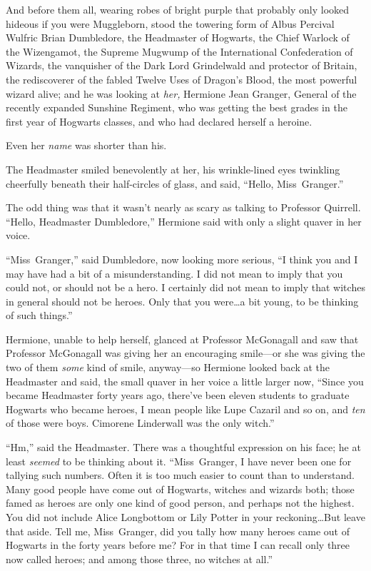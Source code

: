 And before them all, wearing robes of bright purple that probably only looked hideous if you were Muggleborn, stood the towering form of Albus Percival Wulfric Brian Dumbledore, the Headmaster of Hogwarts, the Chief Warlock of the Wizengamot, the Supreme Mugwump of the International Confederation of Wizards, the vanquisher of the Dark Lord Grindelwald and protector of Britain, the rediscoverer of the fabled Twelve Uses of Dragon’s Blood, the most powerful wizard alive; and he was looking at \emph{her,} Hermione Jean Granger, General of the recently expanded Sunshine Regiment, who was getting the best grades in the first year of Hogwarts classes, and who had declared herself a heroine.

Even her \emph{name} was shorter than his.

The Headmaster smiled benevolently at her, his wrinkle-lined eyes twinkling cheerfully beneath their half-circles of glass, and said, “Hello, Miss~Granger.”

The odd thing was that it wasn’t nearly as scary as talking to Professor Quirrell. “Hello, Headmaster Dumbledore,” Hermione said with only a slight quaver in her voice.

“Miss~Granger,” said Dumbledore, now looking more serious, “I think you and I may have had a bit of a misunderstanding. I did not mean to imply that you could not, or should not be a hero. I certainly did not mean to imply that witches in general should not be heroes. Only that you were…a bit young, to be thinking of such things.”

Hermione, unable to help herself, glanced at Professor McGonagall and saw that Professor McGonagall was giving her an encouraging smile—or she was giving the two of them \emph{some} kind of smile, anyway—so Hermione looked back at the Headmaster and said, the small quaver in her voice a little larger now, “Since you became Headmaster forty years ago, there’ve been eleven students to graduate Hogwarts who became heroes, I mean people like Lupe Cazaril and so on, and \emph{ten} of those were boys. Cimorene Linderwall was the only witch.”

“Hm,” said the Headmaster. There was a thoughtful expression on his face; he at least \emph{seemed} to be thinking about it. “Miss~Granger, I have never been one for tallying such numbers. Often it is too much easier to count than to understand. Many good people have come out of Hogwarts, witches and wizards both; those famed as heroes are only one kind of good person, and perhaps not the highest. You did not include Alice Longbottom or Lily Potter in your reckoning…But leave that aside. Tell me, Miss~Granger, did you tally how many heroes came out of Hogwarts in the forty years before me? For in that time I can recall only three now called heroes; and among those three, no witches at all.”

